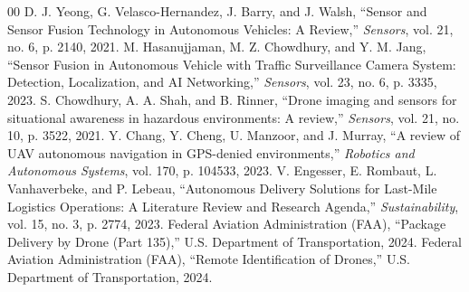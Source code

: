 \documentclass[conference,10pt]{IEEEtran}
\begin{document}
\begin{thebibliography}{00}
 D. J. Yeong, G. Velasco-Hernandez, J. Barry, and J. Walsh, ``Sensor and Sensor Fusion Technology in Autonomous Vehicles: A Review,'' \textit{Sensors}, vol. 21, no. 6, p. 2140, 2021.
 M. Hasanujjaman, M. Z. Chowdhury, and Y. M. Jang, ``Sensor Fusion in Autonomous Vehicle with Traffic Surveillance Camera System: Detection, Localization, and AI Networking,'' \textit{Sensors}, vol. 23, no. 6, p. 3335, 2023.
 S. Chowdhury, A. A. Shah, and B. Rinner, ``Drone imaging and sensors for situational awareness in hazardous environments: A review,'' \textit{Sensors}, vol. 21, no. 10, p. 3522, 2021.
 Y. Chang, Y. Cheng, U. Manzoor, and J. Murray, ``A review of UAV autonomous navigation in GPS-denied environments,'' \textit{Robotics and Autonomous Systems}, vol. 170, p. 104533, 2023.
 V. Engesser, E. Rombaut, L. Vanhaverbeke, and P. Lebeau, ``Autonomous Delivery Solutions for Last-Mile Logistics Operations: A Literature Review and Research Agenda,'' \textit{Sustainability}, vol. 15, no. 3, p. 2774, 2023.
 Federal Aviation Administration (FAA), ``Package Delivery by Drone (Part 135),'' U.S. Department of Transportation, 2024.
 Federal Aviation Administration (FAA), ``Remote Identification of Drones,'' U.S. Department of Transportation, 2024.
\end{thebibliography}
\end{document}
